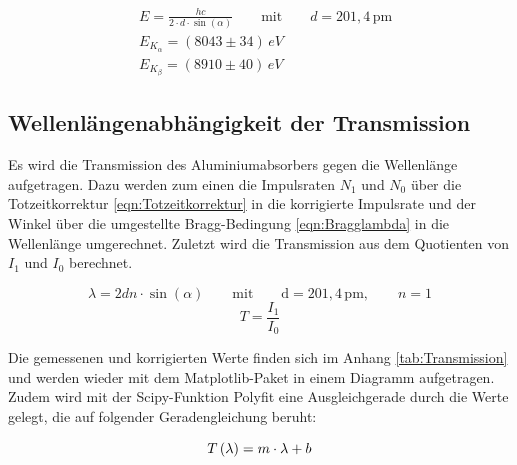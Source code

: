 \documentclass[titlepage = firstcover]{scrartcl}
\begin{document}
        \begin{align}
            &E = \frac{hc}{2 \cdot d \cdot \sin(\alpha)} \qquad \text{mit} \qquad d=201,4 \, \text{pm} \nonumber\\
            &E_{K_{\alpha}} = (8043 \pm 34) \, eV \\
            &E_{K_{\beta}}  = (8910 \pm 40) \, eV
            \label{eqn:EGraph}
        \end{align}

        \subsection{Wellenlängenabhängigkeit der Transmission}
        \noindent
        Es wird die Transmission des Aluminiumabsorbers gegen die Wellenlänge aufgetragen. Dazu werden zum einen die Impulsraten $N_1$ und $N_0$ über die 
        Totzeitkorrektur \ref{eqn:Totzeitkorrektur} in die korrigierte Impulsrate und der Winkel über die umgestellte Bragg-Bedingung \ref{eqn:Bragglambda} in die 
        Wellenlänge umgerechnet. Zuletzt wird die Transmission aus dem Quotienten von  $I_1$ und $I_0$ berechnet.

        \begin{equation}
            \lambda = 2dn \cdot \sin(\alpha) \qquad \text{mit} \qquad \text{d}=201,4 \, \text{pm}, \qquad n=1
            \label{eqn:Bragglambda}
        \end{equation}
        \begin{equation}
            T = \frac{I_1}{I_0}
            \label{eqn:Trans}
        \end{equation}
        
        \noindent
        Die gemessenen und korrigierten Werte finden sich im Anhang \ref{tab:Transmission} und werden wieder mit dem Matplotlib-Paket in einem Diagramm aufgetragen. Zudem wird mit der Scipy-Funktion
        Polyfit eine Ausgleichgerade durch die Werte gelegt, die auf folgender Geradengleichung beruht:

        \begin{equation}
            T\left(\lambda \right) = m \cdot \lambda + b\\
            \label{eqn:Regression}
        \end{equation}
\end{document}
